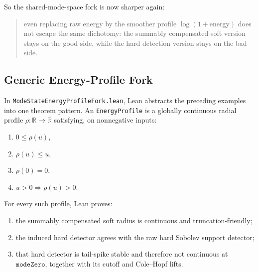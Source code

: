 \documentclass[11pt]{article}
\begin{document}
So the shared-mode-space fork is now sharper again:
\begin{quote}
even replacing raw energy by the smoother profile \(\log(1+\mathrm{energy})\)
does not escape the same dichotomy: the summably compensated soft version stays
on the good side, while the hard detection version stays on the bad side.
\end{quote}

\subsection{Generic Energy-Profile Fork}

In \texttt{ModeStateEnergyProfileFork.lean}, Lean abstracts the preceding
examples into one theorem pattern.  An \texttt{EnergyProfile} is a globally
continuous radial profile \(\rho : \mathbb{R} \to \mathbb{R}\) satisfying, on
nonnegative inputs:
\begin{enumerate}[leftmargin=1.5em]
  \item \(0 \le \rho(u)\),
  \item \(\rho(u) \le u\),
  \item \(\rho(0)=0\),
  \item \(u>0 \Rightarrow \rho(u)>0\).
\end{enumerate}

For every such profile, Lean proves:
\begin{enumerate}[leftmargin=1.5em]
  \item the summably compensated soft radius is continuous and
  truncation-friendly;
  \item the induced hard detector agrees with the raw hard Sobolev support
  detector;
  \item that hard detector is tail-spike stable and therefore not
  continuous at \(\texttt{modeZero}\), together with its cutoff and Cole--Hopf
  lifts.
\end{enumerate}
\end{document}

